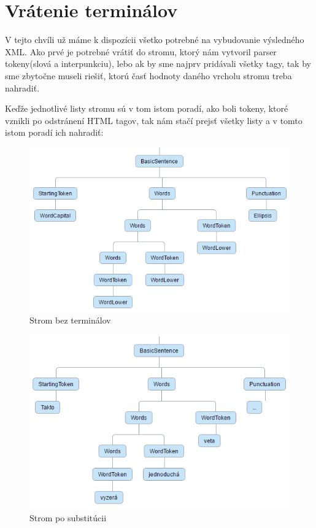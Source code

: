 \documentclass[12pt,a4paper]{report}
\theoremstyle{definition}
\theoremstyle{remark}
\begin{document}
\section{Vrátenie terminálov}

V tejto chvíli už máme k dispozícii všetko potrebné na vybudovanie výsledného XML. Ako prvé je potrebné vrátiť do stromu, ktorý nám vytvoril parser tokeny(slová a interpunkciu), lebo ak by sme najprv pridávali všetky tagy, tak by sme zbytočne museli riešiť, ktorú časť hodnoty daného vrcholu stromu treba nahradiť.

Keďže jednotlivé listy stromu sú v tom istom poradí, ako boli tokeny, ktoré vznikli po odstránení HTML tagov, tak nám stačí prejsť všetky listy a v tomto istom poradí ich nahradiť:


\begin{figure}[h]
\centering
\includegraphics[scale=2.6]{treeBeforeSubstitution}
\caption{Strom bez terminálov}
\end{figure}

\begin{figure}[H]
\includegraphics[scale=2.4]{treeAfterSubstitution}
\caption{Strom po substitúcii}
\end{figure}
\end{document}
